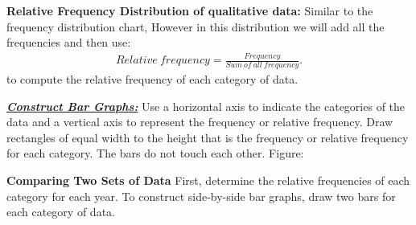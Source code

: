 \documentclass{report}
\begin{document}
        \bigbreak \noindent 
        \textbf{Relative Frequency Distribution of qualitative data:}
        \bigbreak \noindent 
        Similar to the frequency distribution chart, However in this distribution we will add all the frequencies and then use:
        \begin{align*}
            Relative\ frequency = \frac{Frequency}{Sum\ of\ all\ frequency}
        .\end{align*}
        \bigbreak \noindent 
        to compute the relative frequency of each category of data.
        \bigbreak \noindent 
        
        \bigbreak \noindent \bigbreak \noindent 
        \textbf{\textit{\underline{Construct Bar Graphs:}}}
        \bigbreak \noindent 
        Use a horizontal axis to indicate the categories of the data and a vertical axis to represent the frequency or relative frequency. Draw rectangles of equal width to the height that is the frequency or relative frequency for each category. The bars do not touch each other.
        \bigbreak \noindent 
        Figure:
        \begin{center}
            
        \end{center}

        \bigbreak \noindent 
        \textbf{Comparing Two Sets of Data}
        \bigbreak \noindent 
        First, determine the relative frequencies of each category for each year. To construct side-by-side bar graphs, draw two bars for each category of data.
\end{document}
